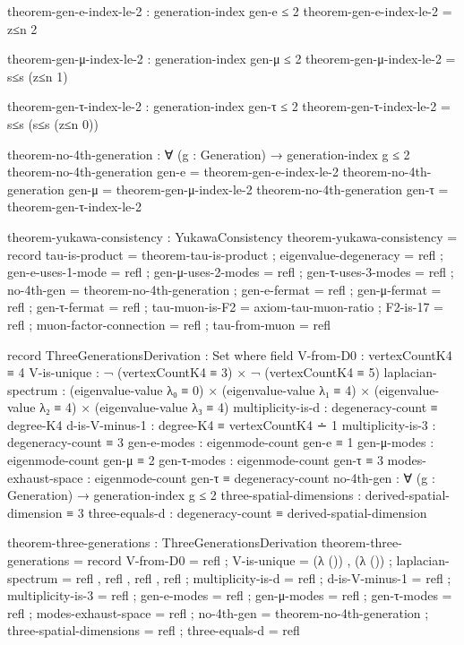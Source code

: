 \documentclass[11pt,a4paper]{book}
\begin{document}
\begin{code}
theorem-gen-e-index-le-2 : generation-index gen-e ≤ 2
theorem-gen-e-index-le-2 = z≤n {2}

theorem-gen-μ-index-le-2 : generation-index gen-μ ≤ 2
theorem-gen-μ-index-le-2 = s≤s (z≤n {1})

theorem-gen-τ-index-le-2 : generation-index gen-τ ≤ 2
theorem-gen-τ-index-le-2 = s≤s (s≤s (z≤n {0}))

theorem-no-4th-generation : ∀ (g : Generation) → generation-index g ≤ 2
theorem-no-4th-generation gen-e = theorem-gen-e-index-le-2
theorem-no-4th-generation gen-μ = theorem-gen-μ-index-le-2
theorem-no-4th-generation gen-τ = theorem-gen-τ-index-le-2

theorem-yukawa-consistency : YukawaConsistency
theorem-yukawa-consistency = record
  { tau-is-product = theorem-tau-is-product
  ; eigenvalue-degeneracy = refl
  ; gen-e-uses-1-mode = refl
  ; gen-μ-uses-2-modes = refl
  ; gen-τ-uses-3-modes = refl
  ; no-4th-gen = theorem-no-4th-generation
  ; gen-e-fermat = refl
  ; gen-μ-fermat = refl
  ; gen-τ-fermat = refl
  ; tau-muon-is-F2 = axiom-tau-muon-ratio
  ; F2-is-17 = refl
  ; muon-factor-connection = refl
  ; tau-from-muon = refl
  }

record ThreeGenerationsDerivation : Set where
  field
    V-from-D0          : vertexCountK4 ≡ 4
    V-is-unique        : ¬ (vertexCountK4 ≡ 3) × ¬ (vertexCountK4 ≡ 5)
    laplacian-spectrum : (eigenvalue-value λ₀ ≡ 0) × 
                         (eigenvalue-value λ₁ ≡ 4) × 
                         (eigenvalue-value λ₂ ≡ 4) × 
                         (eigenvalue-value λ₃ ≡ 4)
    multiplicity-is-d  : degeneracy-count ≡ degree-K4
    d-is-V-minus-1     : degree-K4 ≡ vertexCountK4 ∸ 1
    multiplicity-is-3  : degeneracy-count ≡ 3
    gen-e-modes : eigenmode-count gen-e ≡ 1
    gen-μ-modes : eigenmode-count gen-μ ≡ 2
    gen-τ-modes : eigenmode-count gen-τ ≡ 3
    modes-exhaust-space : eigenmode-count gen-τ ≡ degeneracy-count
    no-4th-gen : ∀ (g : Generation) → generation-index g ≤ 2
    three-spatial-dimensions : derived-spatial-dimension ≡ 3
    three-equals-d           : degeneracy-count ≡ derived-spatial-dimension

theorem-three-generations : ThreeGenerationsDerivation
theorem-three-generations = record
  { V-from-D0          = refl
  ; V-is-unique        = (λ ()) , (λ ())
  ; laplacian-spectrum = refl , refl , refl , refl
  ; multiplicity-is-d  = refl
  ; d-is-V-minus-1     = refl
  ; multiplicity-is-3  = refl
  ; gen-e-modes        = refl
  ; gen-μ-modes        = refl
  ; gen-τ-modes        = refl
  ; modes-exhaust-space = refl
  ; no-4th-gen         = theorem-no-4th-generation
  ; three-spatial-dimensions = refl
  ; three-equals-d     = refl
  }


\end{code}
\end{document}
